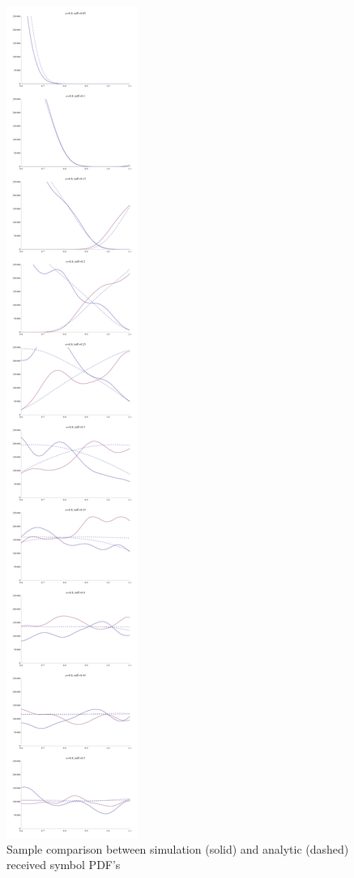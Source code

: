 \begin{figure}[htbp]
\centering
\includegraphics{../plots/comparison_f08_boundary.png}
\caption{Sample comparison between simulation (solid) and analytic
(dashed) received symbol PDF's}
\end{figure}

